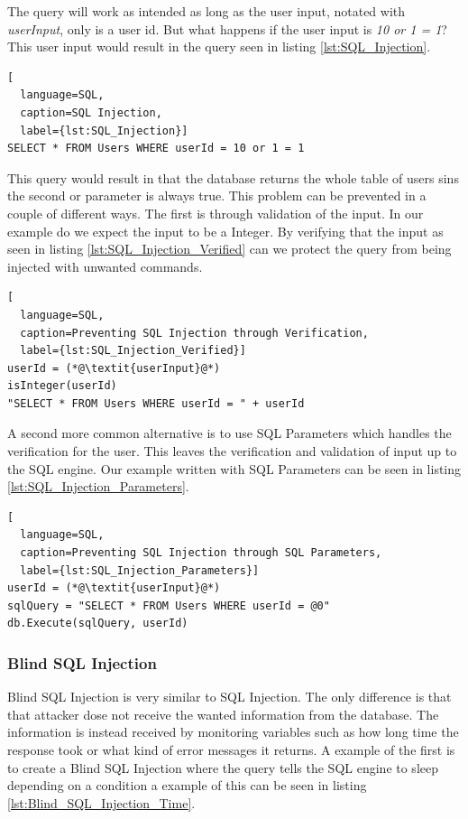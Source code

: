 The query will work as intended as long as the user input, notated with \textit{userInput}, only is a user id. But what happens if the user input is \textit{10 or 1 = 1}? This user input would result in the query seen in listing \ref{lst:SQL_Injection}.

\hfill
\begin{lstlisting}[
  language=SQL,
  caption=SQL Injection,
  label={lst:SQL_Injection}]
SELECT * FROM Users WHERE userId = 10 or 1 = 1
\end{lstlisting}
\hfill

This query would result in that the database returns the whole table of users sins the second or parameter is always true. This problem can be prevented in a couple of different ways. The first is through validation of the input. In our example do we expect the input to be a Integer. By verifying that the input as seen in listing \ref{lst:SQL_Injection_Verified} can we protect the query from being injected with unwanted commands.

\hfill
\begin{lstlisting}[
  language=SQL,
  caption=Preventing SQL Injection through Verification,
  label={lst:SQL_Injection_Verified}]
userId = (*@\textit{userInput}@*)
isInteger(userId)
"SELECT * FROM Users WHERE userId = " + userId
\end{lstlisting}
\hfill

A second more common alternative is to use SQL Parameters which handles the verification for the user. This leaves the verification and validation of input up to the SQL engine. Our example written with SQL Parameters can be seen in listing \ref{lst:SQL_Injection_Parameters}.

\hfill
\begin{lstlisting}[
  language=SQL,
  caption=Preventing SQL Injection through SQL Parameters,
  label={lst:SQL_Injection_Parameters}]
userId = (*@\textit{userInput}@*)
sqlQuery = "SELECT * FROM Users WHERE userId = @0"
db.Execute(sqlQuery, userId)
\end{lstlisting}
\hfill


\subsubsection{Blind SQL Injection}
Blind SQL Injection is very similar to SQL Injection. The only difference is that that attacker dose not receive the wanted information from the database. The information is instead received by monitoring variables such as how long time the response took or what kind of error messages it returns. A example of the first is to create a Blind SQL Injection where the query tells the SQL engine to sleep depending on a condition a example of this can be seen in listing \ref{lst:Blind_SQL_Injection_Time}. \parencite{JustinClarke-Salt2009SIAa, Secure_Web} 

